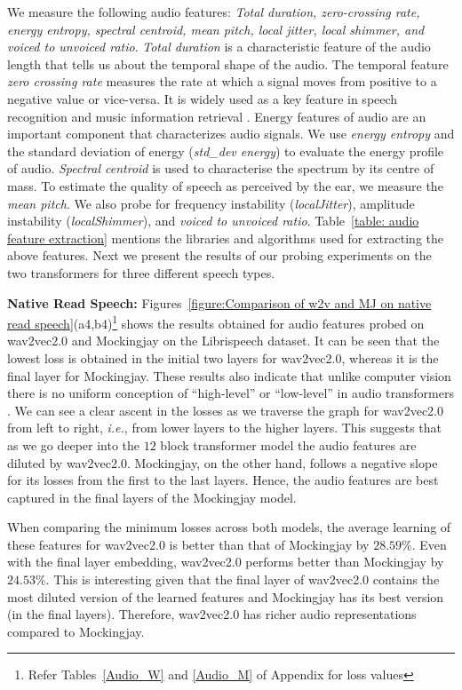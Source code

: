 \documentclass[sigconf]{acmart}
\newcommand{\wv}{wav2vec2.0\xspace}
\newcommand{\mj}{Mockingjay\xspace}
\begin{document}
We measure the following audio features: \emph{Total duration, zero-crossing rate, energy entropy, spectral centroid, mean pitch, local jitter, local shimmer, and voiced to unvoiced ratio}. \emph{Total duration} is a characteristic feature of the audio length that tells us about the temporal shape of the audio. The temporal feature \emph{zero crossing rate} measures the rate at which a signal moves from positive to a negative value or vice-versa. It is widely used as a key feature in speech recognition and music information retrieval \cite{neumayer2007integration,simonetta2019multimodal}. Energy features of audio are an important component that characterizes audio signals. We use \emph{energy entropy} and the standard deviation of energy (\emph{std\_dev energy}) to evaluate the energy profile of audio. \emph{Spectral centroid} is used to characterise the spectrum by its centre of mass. To estimate the quality of speech as perceived by the ear, we measure the \emph{mean pitch}. We also probe for frequency instability (\emph{localJitter}), amplitude instability (\emph{localShimmer}), and \emph{voiced to unvoiced ratio}. Table~\ref{table: audio feature extraction} mentions the libraries and algorithms used for extracting the above features. Next we present the results of our probing experiments on the two transformers for three different speech types.



\textbf{Native Read Speech:} 
Figures~\ref{figure:Comparison of w2v and MJ on native read speech}(a4,b4)\footnote{Refer Tables~\ref{Audio_W} and \ref{Audio_M} of Appendix for loss values} shows the results obtained for audio features probed on wav2vec2.0 and Mockingjay on the Librispeech dataset. It can be seen that the lowest loss is obtained in the initial two layers for wav2vec2.0, whereas it is the final layer for Mockingjay. These results also indicate that unlike computer vision there is no uniform conception of ``high-level'' or ``low-level'' in audio transformers \cite{erhan2010understanding,krizhevsky2012imagenet,girshick2014rich}. We can see a clear ascent in the losses as we traverse the graph for wav2vec2.0 from left to right, \emph{i.e.}, from lower layers to the higher layers. This suggests that as we go deeper into the $12$ block transformer model the audio features are diluted by \wv. \mj, on the other hand, follows a negative slope for its losses from the first to the last layers. Hence, the audio features are best captured in the final layers of the Mockingjay model. 

When comparing the minimum losses across both models, the average learning of these features for \wv is better than that of \mj by $28.59\%$. Even with the final layer embedding, wav2vec2.0 performs better than Mockingjay by $24.53\%$. This is interesting given that the final layer of wav2vec2.0 contains the most diluted version of the learned features and Mockingjay has its best version (in the final layers). Therefore, \wv has richer audio representations compared to \mj.
\end{document}
